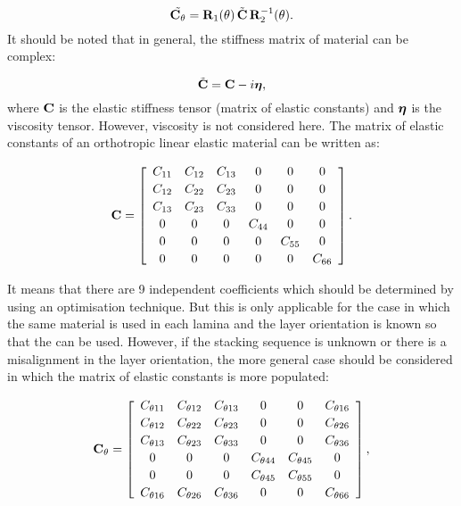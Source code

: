 \begin{equation}
	\tilde{ \mathbf{C}_{\theta}}= \mathbf{R}_1(\theta) \,\tilde{\mathbf{C}} \,\mathbf{R}_2^{-1}(\theta).
	\label{eq:elasticity_tensor}\end{equation}
 It should be noted that in general, the stiffness matrix of material can be complex:
 
\begin{equation}
 \tilde{\mathbf{C}}= \mathbf{C} - i \boldsymbol{\eta},
\label{eq:complex_elasticity_tensor}\end{equation}
 where \(\mathbf{C} \) is the elastic stiffness tensor (matrix of elastic constants) and 
 \(\boldsymbol{\eta}\) is the viscosity tensor. However, viscosity is not considered here. The 
 matrix of elastic constants of an orthotropic linear elastic material can be written as:
 
\begin{equation}
 \mathbf{C} = \left[\begin{array}{cccccc} C_{11} & C_{12}& C_{13} & 0&0&0\\[2pt]
 C_{12}& C_{22} & C_{23}& 0&0&0\\[2pt]
 C_{13}&C_{23}&C_{33}&0&0&0\\[2pt]
 0& 0 &0&C_{44}& 0&0\\[2pt]
 0&0&0&0&C_{55}&0\\[2pt]
  0&0&0&0&0&C_{66}
  \end{array}\right]. 
 \label{eq:elastic_constatns}\end{equation}

 It means that there are 9 independent coefficients which should be determined by using an optimisation technique. But this is only applicable for the case in which the same material is used in each lamina and the layer orientation is known so that the   can be used. However, if the stacking sequence is unknown or there is a misalignment in the layer orientation, the more general case should be considered in which the matrix of elastic constants is more populated:
 
\begin{equation}
 \mathbf{C}_{\theta} = \left[\begin{array}{cccccc} C_{\theta 11} & C_{\theta 12}& C_{\theta 13} & 0&0&C_{\theta 16}\\[2pt]
 C_{\theta 12}& C_{\theta 22} & C_{\theta 23}& 0 &0&C_{\theta 26}\\[2pt]
 C_{\theta 13}&C_{\theta 23}&C_{\theta 33}&0&0&C_{\theta 36}\\[2pt]
 0& 0&0&C_{\theta 44}& C_{\theta 45}&0\\[2pt]
 0&0&0&C_{\theta 45}&C_{\theta 55}&0\\[2pt]
 C_{\theta 16}&C_{\theta 26} &C_{\theta 36}&0&0&C_{\theta 66}
 \end{array}\right], 
\label{eq:elastic_constatns_theta}\end{equation}

